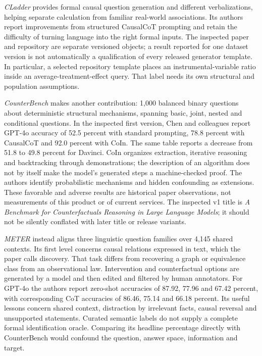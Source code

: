 \emph{CLadder} provides formal causal question generation and different
verbalizations, helping separate calculation from familiar real-world
associations. Its authors report improvements from structured CausalCoT
prompting and retain the difficulty of turning language into the right formal
inputs. The inspected paper and repository are separate versioned objects; a
result reported for one dataset version is not automatically a qualification of
every released generator template. In particular, a selected repository template
places an instrumental-variable ratio inside an average-treatment-effect query.
That label needs its own structural and population assumptions.
\citep{v12_la_2312_04350,exec14_ident_packages}

\emph{CounterBench} makes another contribution: 1,000 balanced binary questions
about deterministic structural mechanisms, spanning basic, joint, nested and
conditional questions. In the inspected first version, Chen and colleagues report
GPT-4o accuracy of 52.5 percent with standard prompting, 78.8 percent with
CausalCoT and 92.0 percent with CoIn. The same table reports a decrease from
51.8 to 49.8 percent for Davinci. CoIn organizes extraction, iterative reasoning
and backtracking through demonstrations; the description of an algorithm does
not by itself make the model's generated steps a machine-checked proof. The
authors identify probabilistic mechanisms and hidden confounding as extensions.
These favorable and adverse results are historical paper observations, not
measurements of this product or of current services. The inspected v1 title is
\emph{A Benchmark for Counterfactuals Reasoning in Large Language Models}; it
should not be silently conflated with later title or release variants.
\citep{exec14_ident_counterbench}

\emph{METER} instead aligns three linguistic question families over 4,145 shared
contexts. Its first level concerns causal relations expressed in text, which the
paper calls discovery. That task differs from recovering a graph or equivalence
class from an observational law. Intervention and counterfactual options are
generated by a model and then edited and filtered by human annotators. For
GPT-4o the authors report zero-shot accuracies of 87.92, 77.96 and 67.42 percent,
with corresponding CoT accuracies of 86.46, 75.14 and 66.18 percent. Its useful
lessons concern shared context, distraction by irrelevant facts, causal reversal
and unsupported statements. Curated semantic labels do not supply a complete
formal identification oracle. Comparing its headline percentage directly with
CounterBench would confound the question, answer space, information and target.
\citep{exec14_ident_meter}

